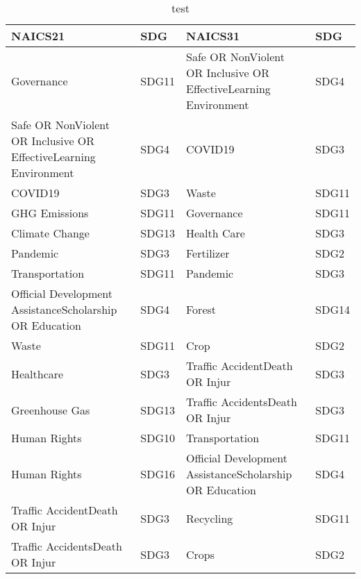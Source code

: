 \begin{table}

\caption{\label{tab:}test}
\centering
\begin{tabular}[t]{llll}
\toprule
NAICS21 & SDG & NAICS31 & SDG \\
\midrule
Governance & SDG11 & Safe OR NonViolent OR Inclusive OR EffectiveLearning Environment & SDG4\\
Safe OR NonViolent OR Inclusive OR EffectiveLearning Environment & SDG4 & COVID19 & SDG3\\
COVID19 & SDG3 & Waste & SDG11\\
GHG Emissions & SDG11 & Governance & SDG11\\
Climate Change & SDG13 & Health Care & SDG3\\
\addlinespace
Pandemic & SDG3 & Fertilizer & SDG2\\
Transportation & SDG11 & Pandemic & SDG3\\
Official Development AssistanceScholarship OR Education & SDG4 & Forest & SDG14\\
Waste & SDG11 & Crop & SDG2\\
Healthcare & SDG3 & Traffic AccidentDeath OR Injur & SDG3\\
\addlinespace
Greenhouse Gas & SDG13 & Traffic AccidentsDeath OR Injur & SDG3\\
Human Rights & SDG10 & Transportation & SDG11\\
Human Rights & SDG16 & Official Development AssistanceScholarship OR Education & SDG4\\
Traffic AccidentDeath OR Injur & SDG3 & Recycling & SDG11\\
Traffic AccidentsDeath OR Injur & SDG3 & Crops & SDG2\\
\bottomrule
\end{tabular}
\end{table}

